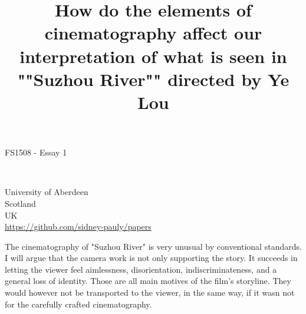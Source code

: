 \documentclass[fleqn,14pt]{article}
\begin{document}
\lstset{
  language=Python,
  basicstyle=\small,          %
  keywordstyle=\bfseries,
  identifierstyle=,           %
  commentstyle=,              %
  stringstyle=\ttfamily,      %
  showstringspaces=false,     %
  numbers=left,
  numberstyle=\tiny,
  numbersep=5pt,
  frame=tb,
}

\title{How do the elements of cinematography affect our interpretation of what is seen in ""Suzhou River"" directed by Ye Lou }
\date{}




\fancyhf{}



\begin{titlepage}
  \begin{center}
    \Large
    \textbf{\thetitle}
        
    \vspace{0.4cm}
    \large
    FS1508 - Essay 1
        
    \vspace{0.4cm}
    \textbf{\theauthor}\\
    \textbf{\theuoastudentid}

       
    \vfill


    University of Aberdeen\\
    Scotland\\
    UK\\
    \thedate
    \vspace{0.4cm}
    \url{https://github.com/sidney-pauly/papers}
  \end{center}
\end{titlepage}


The cinematography of "Suzhou River" is very unusual by conventional standards. I will argue that
the camera work is not only supporting the story. It succeeds in letting the viewer feel
aimlessness, disorientation, indiscriminateness, and a general loss of identity. Those are all main
motives of the film's storyline. They would however not be transported to the viewer, in the same way,
if it wasn not for the carefully crafted cinematography. 
\end{document}

